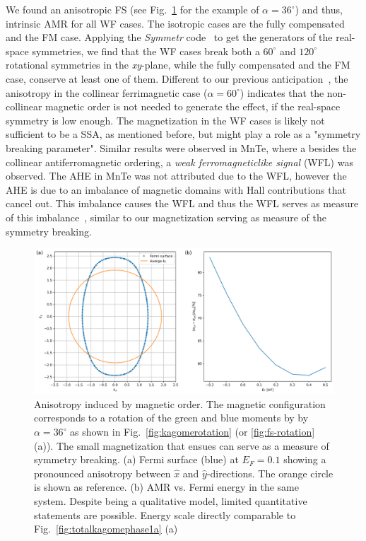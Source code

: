 \documentclass[prb,showpacs,amsmath,amssymb,superscriptaddress,twocolumn,floatfix]{revtex4-1}
\begin{document}
We found an anisotropic FS (see Fig.~\ref{fig:asymmFS} for the example of $\alpha = 36^\circ$) and thus, intrinsic AMR for all WF cases. The isotropic cases are the fully compensated and the FM case. Applying the \textit{Symmetr} code~\cite{Symmetr} to get the generators of the real-space symmetries, we find that the WF cases break both a $60^\circ$ and $120^\circ$ rotational symmetries in the \textit{xy}-plane, while the fully compensated and the FM case, conserve at least one of them. 
Different to our previous anticipation~\cite{Ritzinger:2023}, the anisotropy in the collinear ferrimagnetic case ($\alpha = 60^\circ$) indicates that the non-collinear magnetic order is not needed to generate the effect, if the real-space symmetry is low enough. The magnetization in the WF cases is likely not sufficient to be a SSA, as mentioned before, but might play a role as a "symmetry breaking parameter". Similar results were observed in MnTe, where a besides the collinear antiferromagnetic ordering, a \textit{weak ferromagneticlike signal} (WFL) was observed. The AHE in MnTe was not attributed due to the WFL, however the AHE is due to an imbalance of magnetic domains with Hall contributions that cancel out. This imbalance causes the WFL and thus the WFL serves as measure of this imbalance~\cite{Kluczyk:2024}, similar to our magnetization serving as measure of the symmetry breaking.

\begin{figure}
	\centering
	\includegraphics[width=\linewidth]{img/fig4_new}
	\caption{Anisotropy induced by magnetic order. The magnetic configuration corresponds to a rotation of the green and blue moments by by~$\alpha = 36^\circ$ as shown in Fig.~\ref{fig:kagomerotation} (or \ref{fig:fs-rotation} (a)). The small magnetization that ensues can serve as a measure of symmetry breaking. 		
		(a) Fermi surface (blue) at $E_F = 0.1$ showing a pronounced anisotropy between $\hat{x}$ and $\hat{y}$-directions. The orange circle is shown as reference.	
		(b) AMR vs. Fermi energy in the same system. Despite being a qualitative model, limited quantitative statements are possible. Energy scale directly comparable to Fig.~\ref{fig:totalkagomephase1a} (a)}
	\label{fig:asymmFS}
\end{figure}
\end{document}
